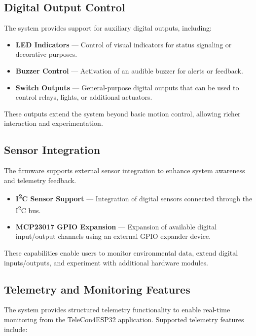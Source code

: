 \subsection{Digital Output Control}

The system provides support for auxiliary digital outputs, including:

\begin{itemize}
	\item \textbf{LED Indicators} — Control of visual indicators for status signaling or decorative purposes.
	
	\item \textbf{Buzzer Control} — Activation of an audible buzzer for alerts or feedback.
	
	\item \textbf{Switch Outputs} — General-purpose digital outputs that can be used to control relays, lights, or additional actuators.
\end{itemize}

These outputs extend the system beyond basic motion control, allowing richer interaction and experimentation.

\subsection{Sensor Integration}

The firmware supports external sensor integration to enhance system awareness and telemetry feedback.

\begin{itemize}
	\item \textbf{I\textsuperscript{2}C Sensor Support} — Integration of digital sensors connected through the I\textsuperscript{2}C bus.
	
	\item \textbf{MCP23017 GPIO Expansion} — Expansion of available digital input/output channels using an external GPIO expander device.
\end{itemize}

These capabilities enable users to monitor environmental data, extend digital inputs/outputs, and experiment with additional hardware modules.

\subsection{Telemetry and Monitoring Features}

The system provides structured telemetry functionality to enable real-time monitoring from the TeleCon4ESP32 application. Supported telemetry features include:

